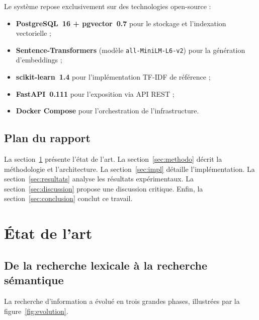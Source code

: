 \documentclass[12pt,a4paper]{article}
\begin{document}
Le syst\`{e}me repose exclusivement sur des technologies open-source :
\begin{itemize}[noitemsep]
    \item \textbf{PostgreSQL~16 + pgvector~0.7} \cite{pgvector2023} pour le stockage et l'indexation vectorielle ;
    \item \textbf{Sentence-Transformers} \cite{reimers2019sentence} (mod\`{e}le \texttt{all-MiniLM-L6-v2}) pour la g\'{e}n\'{e}ration d'embeddings ;
    \item \textbf{scikit-learn~1.4} pour l'impl\'{e}mentation TF-IDF de r\'{e}f\'{e}rence ;
    \item \textbf{FastAPI~0.111} pour l'exposition via API REST ;
    \item \textbf{Docker Compose} pour l'orchestration de l'infrastructure.
\end{itemize}

\subsection{Plan du rapport}

La section~\ref{sec:etat} pr\'{e}sente l'\'{e}tat de l'art. La section~\ref{sec:methodo} d\'{e}crit la m\'{e}thodologie et l'architecture. La section~\ref{sec:impl} d\'{e}taille l'impl\'{e}mentation. La section~\ref{sec:resultats} analyse les r\'{e}sultats exp\'{e}rimentaux. La section~\ref{sec:discussion} propose une discussion critique. Enfin, la section~\ref{sec:conclusion} conclut ce travail.

\section{\'{E}tat de l'art}
\label{sec:etat}

\subsection{De la recherche lexicale \`{a} la recherche s\'{e}mantique}

La recherche d'information a \'{e}volu\'{e} en trois grandes phases, illustr\'{e}es par la figure~\ref{fig:evolution}.
\end{document}

